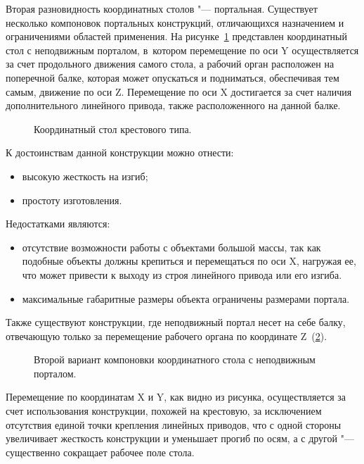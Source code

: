 Вторая разновидность координатных столов "--- портальная. Существует несколько компоновок портальных конструкций, отличающихся назначением и ограничениями областей применения. На рисунке~\cref{fig:coord-1} представлен координатный стол с неподвижным порталом, в~котором перемещение по оси Y осуществляется за счет продольного движения самого стола, а рабочий орган расположен на поперечной балке, которая может опускаться и подниматься, обеспечивая тем самым, движение по оси Z. Перемещение по оси X достигается за счет наличия дополнительного линейного привода, также расположенного на данной балке.

\begin{figure}[ht]
	\caption{Координатный стол крестового типа.}\label{fig:coord-1}
\end{figure}

К достоинствам данной конструкции можно отнести:

\begin{itemize}
	\item высокую жесткость на изгиб;
	
	\item простоту изготовления.
\end{itemize}

Недостатками являются:

\begin{itemize}
	\item отсутствие возможности работы с объектами большой массы, так как подобные объекты должны крепиться и перемещаться по оси X, нагружая ее, что может привести к выходу из строя линейного привода или его изгиба.
	
	\item максимальные габаритные размеры объекта ограничены размерами портала.	
\end{itemize}

Также существуют конструкции, где неподвижный портал несет на себе балку, отвечающую только за перемещение рабочего органа по координате Z~(\cref{fig:coord-2}).

\begin{figure}[ht]
	\caption{Второй вариант компоновки координатного стола с неподвижным порталом.}\label{fig:coord-2}
\end{figure}

Перемещение по координатам X и Y, как видно из рисунка, осуществляется за счет использования конструкции, похожей на крестовую, за исключением отсутствия единой точки крепления линейных приводов, что с одной стороны увеличивает жесткость конструкции и уменьшает прогиб по осям, а с другой "--- существенно сокращает рабочее поле стола.

